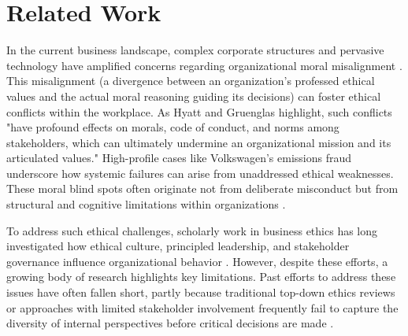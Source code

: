 \section{Related Work}


In the current business landscape, complex corporate structures and pervasive technology have amplified concerns regarding organizational moral misalignment \cite{martinez}. This misalignment (a divergence between an organization's professed ethical values and the actual moral reasoning guiding its decisions) can foster ethical conflicts within the workplace. As Hyatt and Gruenglas \cite{hyatt} highlight, such conflicts "have profound effects on morals, code of conduct, and norms among stakeholders, which can ultimately undermine an organizational mission and its articulated values." High-profile cases like Volkswagen's emissions fraud \cite{ameen_2020} underscore how systemic failures can arise from unaddressed ethical weaknesses. These moral blind spots often originate not from deliberate misconduct but from structural and cognitive limitations within organizations \cite{sezer_etal_2015}.

To address such ethical challenges, scholarly work in business ethics has long investigated how ethical culture, principled leadership, and stakeholder governance influence organizational behavior \cite{donaldson_preston_1995}. However, despite these efforts, a growing body of research highlights key limitations. Past efforts to address these issues have often fallen short, partly because traditional top-down ethics reviews or approaches with limited stakeholder involvement frequently fail to capture the diversity of internal perspectives before critical decisions are made \cite{mitchell2020stakeholder, kujala}.

